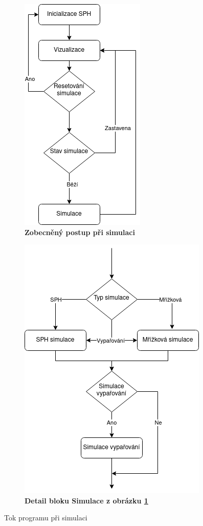 \begin{figure}[h]
	\centering
	\begin{subfigure}[t]{.5\textwidth}
			\centering
        	\includegraphics[scale=0.6]{obrazky-figures/SimFlow.png}
        	\caption{\textbf{Zobecněný postup při simulaci}}
        	\label{fig:simflow}
	\end{subfigure}%
	\begin{subfigure}[t]{.5\textwidth}
		\centering
		\includegraphics[scale=0.6]{obrazky-figures/SimTypeFLow.png}
		\caption{\textbf{Detail bloku Simulace z obrázku \ref{fig:simflow}}}
		\label{fig:simTypeflow}
	\end{subfigure}
	\caption{Tok programu při simulaci}
	\label{fig:SimulationFlow}
\end{figure}

